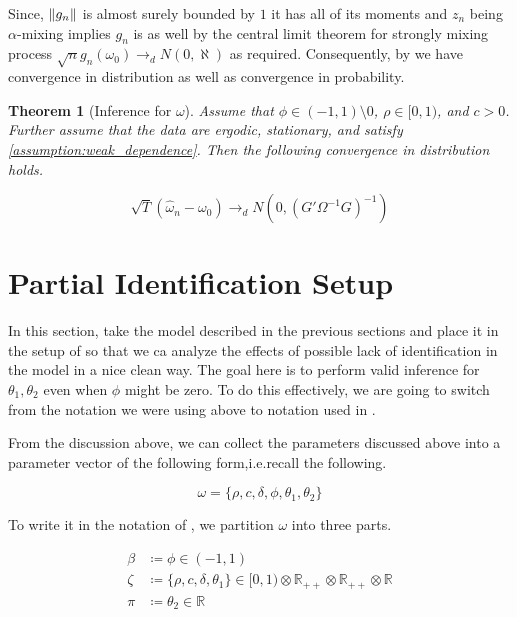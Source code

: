 \documentclass[11pt]{article}
\newtheorem{Theorem}{Theorem}[section]
\newcommand*{\R}{\mathbb{R}}
\newcommand*{\N}{N}
\newcommand*{\dto}{\ensuremath{\rightarrow_d}}
\DeclarePairedDelimiter\norm{\lVert}{\rVert}
\begin{document}
Since, $\norm*{g_n}$ is almost surely bounded by $1$ it has all of its moments and $z_n$ being $\alpha$-mixing
implies $g_n$ is as well by the central limit theorem for strongly mixing process 
$\sqrt{n} g_n(\omega_0) \dto \N(0,\aleph)$ as required. 
Consequently, by \textcite[Theorem 3.2]{newey1994large} we have convergence in distribution as well as convergence
in probability.

\begin{Theorem}[Inference for $\omega$]
    Assume that $\phi  \in (-1,1) \setminus 0$, $\rho \in [0,1)$, and $c > 0$. 
    Further assume that the data are ergodic, stationary, and satisfy \cref{assumption:weak_dependence}.
    Then the following convergence in distribution holds.

    \begin{equation}
        \sqrt{T} (\widehat{\omega}_n - \omega_{0}) \dto \N\left(0, \left(G' \Omega^{-1} G\right)^{-1}\right)
    \end{equation}
\end{Theorem}


\section{Partial Identification Setup}

In this section, take the model described in the previous sections and place it in the setup of
\textcite{andrewsGmm2014} so that we ca analyze the effects of possible lack of identification in the model in a
nice clean way.
The goal here is to perform valid inference for $\theta_1, \theta_2$ even when $\phi$ might be zero. 
To do this effectively, we are going to switch from the notation we were using above to notation used in
\textcite{andrewsGmm2014}. 


From the discussion above, we can collect the parameters discussed above into a parameter vector of the following
form,i.e.\@ recall the following.

\begin{equation}
    \omega = \lbrace \rho, c, \delta, \phi, \theta_1, \theta_2 \rbrace
\end{equation}

To write it in the notation of \textcite{andrewsGmm2014}, we partition $\omega$ into three parts.


\begin{align}
    \beta &\coloneqq \phi  \in (-1, 1) \\ 
    \zeta &\coloneqq \lbrace \rho, c, \delta, \theta_1 \rbrace \in [0,1) \otimes \R_{++} \otimes \R_{++} \otimes
    \R  \\
    \pi &\coloneqq \theta_2 \in \R 
\end{align}
\end{document}
